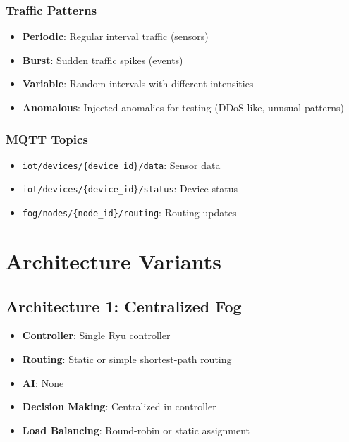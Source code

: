 \documentclass[11pt,a4paper]{article}
\begin{document}
\subsubsection{Traffic Patterns}
\begin{itemize}
    \item \textbf{Periodic}: Regular interval traffic (sensors)
    \item \textbf{Burst}: Sudden traffic spikes (events)
    \item \textbf{Variable}: Random intervals with different intensities
    \item \textbf{Anomalous}: Injected anomalies for testing (DDoS-like, unusual patterns)
\end{itemize}

\subsubsection{MQTT Topics}
\begin{itemize}
    \item \texttt{iot/devices/\{device\_id\}/data}: Sensor data
    \item \texttt{iot/devices/\{device\_id\}/status}: Device status
    \item \texttt{fog/nodes/\{node\_id\}/routing}: Routing updates
\end{itemize}

\section{Architecture Variants}

\subsection{Architecture 1: Centralized Fog}
\begin{itemize}
    \item \textbf{Controller}: Single Ryu controller
    \item \textbf{Routing}: Static or simple shortest-path routing
    \item \textbf{AI}: None
    \item \textbf{Decision Making}: Centralized in controller
    \item \textbf{Load Balancing}: Round-robin or static assignment
\end{itemize}
\end{document}
